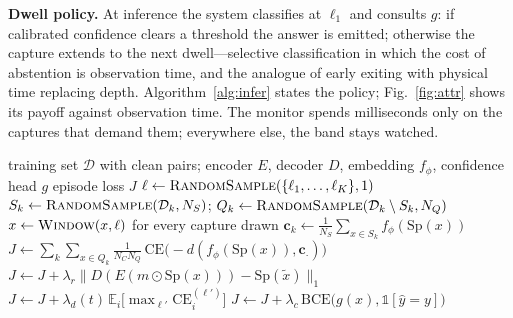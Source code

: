 \documentclass[10pt,twocolumn]{article}
\newcommand{\method}{DACS}
\begin{document}
\textbf{Dwell policy.} At inference the system classifies at $\ell_1$ and
consults $g$: if calibrated confidence \cite{guo2017} clears a threshold
the answer is emitted; otherwise the capture extends to the next
dwell---selective classification \cite{geifman2017} in which the cost of
abstention is observation time, and the analogue of early exiting
\cite{teerapittayanon2016,huang2018} with physical time replacing depth.
Algorithm~\ref{alg:infer} states the policy; Fig.~\ref{fig:attr}
shows its payoff against observation time. The monitor spends milliseconds
only on the captures that demand them; everywhere else, the band stays
watched.

\begin{algorithm}[t]
\caption{\method{} training-episode loss. $N_C{=}7$ classes per
episode; $N_S$, $N_Q$ support/query captures per class; dwell set
$\{\ell_1{<}\dots{<}\ell_K\}$; $\lambda_r,\lambda_d(t),\lambda_c$
loss weights ($\lambda_d$ ramped). $\textsc{RandomSample}(S,N)$ draws
$N$ elements uniformly without replacement;
$\textsc{Window}(x,\ell)$ extracts a random-offset window of duration
$\ell$ from capture $x$; $\mathrm{Sp}$ is the STFT stack; $m$ a random
time-frame mask. $\mathcal{D}_k$ is the training subset with class $k$;
every capture $x$ is paired with its clean reference $\tilde{x}$.}
\label{alg:train}
\begin{algorithmic}\footnotesize
\Require training set $\mathcal{D}$ with clean pairs; encoder $E$,
decoder $D$, embedding $f_{\phi}$, confidence head $g$
\Ensure episode loss $J$
\State $\ell \gets \textsc{RandomSample}(\{\ell_1,\dots,\ell_K\},1)$
  \State $S_k \gets \textsc{RandomSample}(\mathcal{D}_k, N_S)$;\;
    $Q_k \gets \textsc{RandomSample}(\mathcal{D}_k \setminus S_k, N_Q)$
  \State $x \gets \textsc{Window}(x,\ell)$ for every capture drawn
  \State $\mathbf{c}_k \gets \tfrac{1}{N_S}\sum_{x \in S_k}
    f_{\phi}(\mathrm{Sp}(x))$ 
\EndFor
\State $J \gets \sum_{k}\sum_{x \in Q_k}
  \tfrac{1}{N_C N_Q}\,\mathrm{CE}\big({-}d(f_{\phi}(\mathrm{Sp}(x)),
  \mathbf{c}_{\cdot})\big)$ 
\State $J \gets J + \lambda_r \lVert
  D(E(m \odot \mathrm{Sp}(x))) - \mathrm{Sp}(\tilde{x})
  \rVert_1$ 
\State $J \gets J + \lambda_d(t)\, \mathbb{E}_i\big[\max_{\ell'}
  \mathrm{CE}_i^{(\ell')}\big]$ 
\State $J \gets J + \lambda_c\,\mathrm{BCE}\big(g(x),
  \mathbb{1}[\hat{y}=y]\big)$ 
\end{algorithmic}
\end{algorithm}
\end{document}
